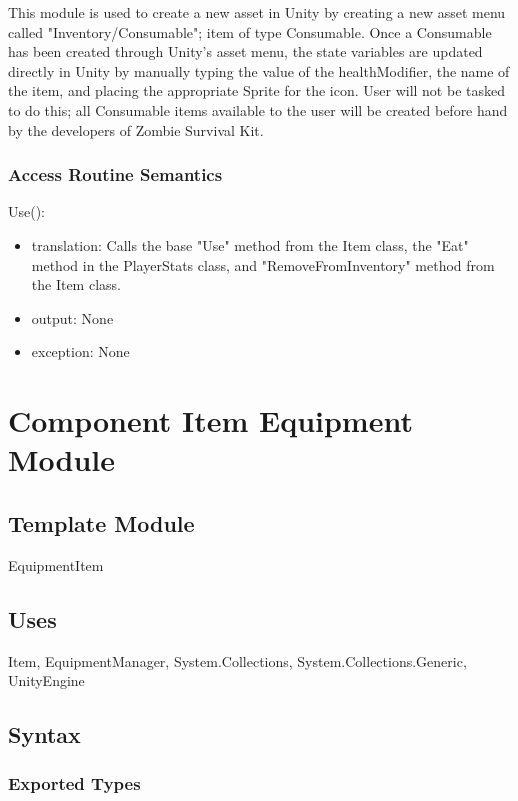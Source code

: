 \documentclass[12pt]{article}
\begin{document}
This module is used to create a new asset in Unity by creating a new asset menu called "Inventory/Consumable"; item of type Consumable. Once a Consumable has been created through Unity's asset menu, the state variables are updated directly in Unity by manually typing the value of the healthModifier, the name of the item, and placing the appropriate Sprite for the icon. User will not be tasked to do this; all Consumable items available to the user will be created before hand by the developers of Zombie Survival Kit.

\subsubsection* {Access Routine Semantics}

\noindent Use():
\begin{itemize}
\item translation: Calls the base "Use" method from the Item class, the "Eat" method in the PlayerStats class, and "RemoveFromInventory" method from the Item class.
\item output: None
\item exception: None
\end{itemize}

\newpage

\section* {Component Item Equipment Module}

\subsection*{Template Module}

EquipmentItem

\subsection* {Uses}

Item, EquipmentManager, System.Collections, System.Collections.Generic, UnityEngine

\subsection* {Syntax}

\subsubsection* {Exported Types}
\end{document}

